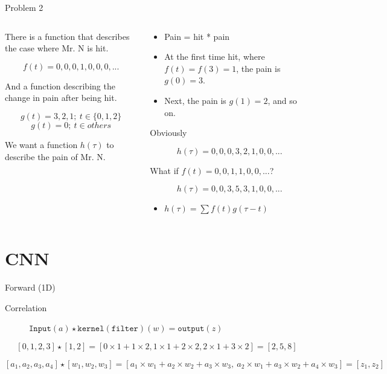 \documentclass[aspectratio=1610,xcolor={dvipsnames},hyperref={colorlinks,unicode,linkcolor=violet,anchorcolor=BlueViolet,citecolor=YellowOrange,filecolor=black,urlcolor=Aquamarine}]{beamer}
\begin{document}
\begin{frame}[label={sec:org7afa838}]{Problem 2}
\begin{columns}
\begin{column}{0.4\columnwidth}
There is a function that describes the case where Mr. N is hit.

\[f(t) = 0, 0, 0, 1, 0, 0, 0, ...\]

And a function describing the change in pain after being hit.

\[g(t) = 3, 2, 1;\ t \in \{0, 1, 2\}\]
\[g(t) = 0;\ t \in others\]

We want a function \(h(\tau)\) to describe the pain of Mr. N.
\end{column}

\begin{column}{0.5\columnwidth}
\begin{itemize}
\item Pain = hit * pain
\item At the first time hit, where \(f(t) = f(3) = 1\), the pain is \(g(0) = 3\).
\item Next, the pain is \(g(1) = 2\), and so on.
\end{itemize}

Obviously

\[h(\tau) = 0, 0, 0, 3, 2, 1, 0, 0, ...\]

What if \(f(t) = 0, 0, 1, 1, 0, 0, ...\)?

\[h(\tau) = 0, 0, 3, 5, 3, 1, 0, 0, ...\]

\begin{itemize}
\item \(h(\tau) = \sum f(t)g(\tau - t)\)
\end{itemize}
\end{column}
\end{columns}
\end{frame}

\section{CNN}
\label{sec:org22e42ed}

\begin{frame}[label={sec:org50920e0}]{Forward (1D)}
\begin{description}
\item[{Correlation}] \(\mathtt {Input}(a) \star \mathtt {kernel (filter)}(w) = \mathtt {output}(z)\)
\end{description}

\[[0, 1, 2, 3] \star [1,2] = [0 \times 1 + 1 \times 2, 1 \times 1 + 2 \times 2, 2 \times 1 + 3 \times 2] = [2, 5, 8]\]

\[[a_{1}, a_{2}, a_{3}, a_{4}] \star [w_{1}, w_{2}, w_{3}] = [a_{1} \times w_{1} + a_{2} \times w_{2} + a_{3} \times w_{3},\ a_{2} \times w_{1} + a_{3} \times w_{2} + a_{4} \times w_{3}] = [z_{1}, z_{2}]\]
\end{frame}
\end{document}
